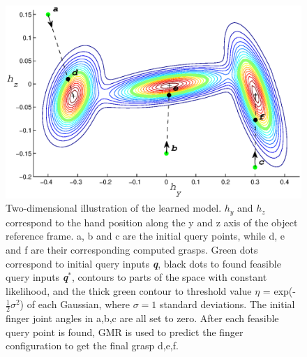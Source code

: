 \begin{figure}
  \vspace{0.2in}
  \includegraphics[width=14cm]{./fig_cha3/contour2-3_4.eps}
  \caption{\scriptsize{
  Two-dimensional illustration of the learned model. $h_y$ and $h_z$ correspond to the hand position along the y and z axis of the object reference frame. a, b and c are the initial query points, while d, e and f are their corresponding computed grasps.
  Green dots correspond to initial query inputs  {\bf {\em q}}, black dots to found feasible query inputs {\bf {\em q}}$^*$, contours to parts of the space with constant likelihood, and the thick green contour to threshold value $\eta$ = exp(-$\frac{1}{2}\sigma^2$) of each Gaussian, where $\sigma = 1$ standard deviations.
  The initial finger joint angles in a,b,c are all set to zero. After each feasible query point is found, GMR is used to predict the finger configuration to get the final grasp d,e,f. }
}
    \label{contour}
\end{figure}


